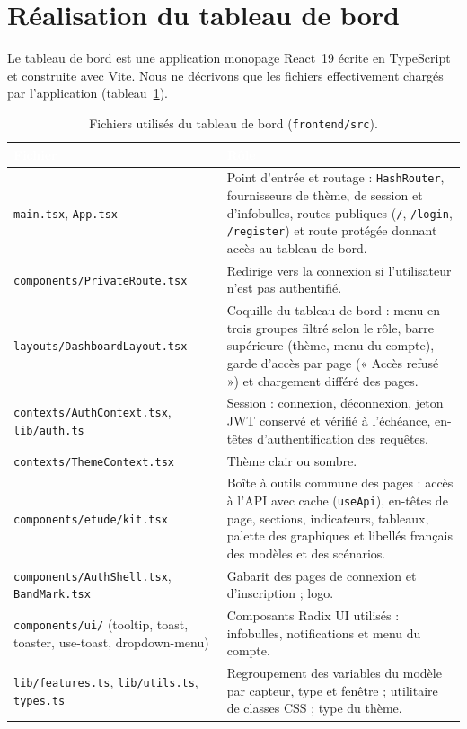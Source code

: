 \section{Réalisation du tableau de bord}

Le tableau de bord est une application monopage React~19 écrite en TypeScript
et construite avec Vite. Nous ne décrivons que les fichiers effectivement
chargés par l'application (tableau~\ref{tab:front}).

\begin{table}[H]
\centering
\small
\renewcommand{\arraystretch}{1.4}
\setlength{\arrayrulewidth}{0.8pt}
\caption{Fichiers utilisés du tableau de bord (\texttt{frontend/src}).}
\label{tab:front}
\begin{tabularx}{\textwidth}{@{}>{\raggedright\arraybackslash}p{4.6cm} >{\raggedright\arraybackslash}X@{}}
\rowcolor{thead}
\textcolor{white}{\textbf{Fichier}} & \textcolor{white}{\textbf{Rôle}} \\
\hline
\texttt{main.tsx}, \texttt{App.tsx} &
Point d'entrée et routage : \texttt{HashRouter}, fournisseurs de thème, de
session et d'infobulles, routes publiques (\texttt{/}, \texttt{/login},
\texttt{/register}) et route protégée donnant accès au tableau de bord. \\
\rowcolor{trowa}
\texttt{components/PrivateRoute.tsx} &
Redirige vers la connexion si l'utilisateur n'est pas authentifié. \\
\texttt{layouts/DashboardLayout.tsx} &
Coquille du tableau de bord : menu en trois groupes filtré selon le rôle,
barre supérieure (thème, menu du compte), garde d'accès par page (« Accès
refusé ») et chargement différé des pages. \\
\rowcolor{trowa}
\texttt{contexts/AuthContext.tsx}, \texttt{lib/auth.ts} &
Session : connexion, déconnexion, jeton JWT conservé et vérifié à l'échéance,
en-têtes d'authentification des requêtes. \\
\texttt{contexts/ThemeContext.tsx} &
Thème clair ou sombre. \\
\rowcolor{trowa}
\texttt{components/etude/kit.tsx} &
Boîte à outils commune des pages : accès à l'API avec cache (\texttt{useApi}),
en-têtes de page, sections, indicateurs, tableaux, palette des graphiques et
libellés français des modèles et des scénarios. \\
\texttt{components/AuthShell.tsx}, \texttt{BandMark.tsx} &
Gabarit des pages de connexion et d'inscription ; logo. \\
\rowcolor{trowa}
\texttt{components/ui/} (tooltip, toast, toaster, use-toast, dropdown-menu) &
Composants Radix UI utilisés : infobulles, notifications et menu du compte. \\
\texttt{lib/features.ts}, \texttt{lib/utils.ts}, \texttt{types.ts} &
Regroupement des variables du modèle par capteur, type et fenêtre ;
utilitaire de classes CSS ; type du thème. \\
\hline
\end{tabularx}
\end{table}

